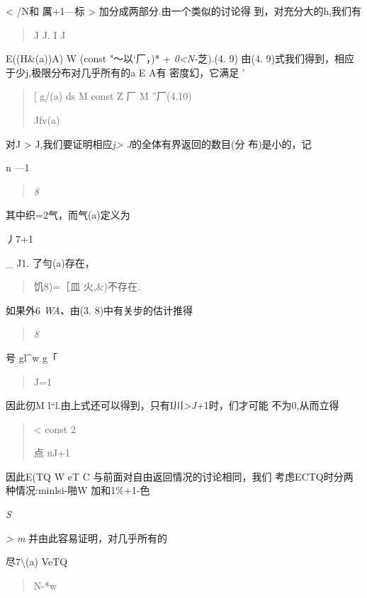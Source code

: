 \documentclass{article}
\begin{document}
\textless{} /N和 厲+1---标 \textgreater{}
加分成两部分.由一个类似的讨论得 到，对充分大的h,我们有

\begin{quote}
J J. I J
\end{quote}

E((H\&(a))A) W (const "〜以`厂，)* + \emph{0\textless{}N-}芝).(4. 9)
由(4. 9)式我们得到，相应于少j,极限分布对几乎所有的a E A有 密度幻，它满足
'

\begin{quote}
{[} g/(a) ds M const Z 厂 M ''厂(4.10)

Jfv(a)
\end{quote}

对J \textgreater{} J,我们要证明相应\emph{j\textgreater{}
J}的全体有界返回的数目(分 布)是小的，记

n ---1

\begin{quote}
\emph{8}
\end{quote}

其中织=2气，而气(a)定义为

丿7+1

\_ J1. 了勻(a)存在，

\begin{quote}
饥8)=［皿 火,\&)不存在.
\end{quote}

如果外6 \emph{WA、}由(3. 8)中有关步的估计推得

\begin{quote}
\emph{8}
\end{quote}

号 gl\^{}w g\textbar{}「

\begin{quote}
J=1
\end{quote}

因此仞M
l``l.由上式还可以得到，只有I川\emph{\textgreater{}J+}1时，们才可能
不为0,从而立得

\begin{quote}
\textless{} const 2

点 \textsc{hJ+1}
\end{quote}

因此E(TQ W eT C 与前面对自由返回情况的讨论相同，我们
考虑ECTQ时分两种情况:minlsi-啪W 加和1\%+1-色\textbar{}

\emph{S}

\emph{\textgreater{} m} 并由此容易证明，对几乎所有的

尽7\textbackslash{}(a) VeTQ

\begin{quote}
N-*w
\end{quote}
\end{document}
